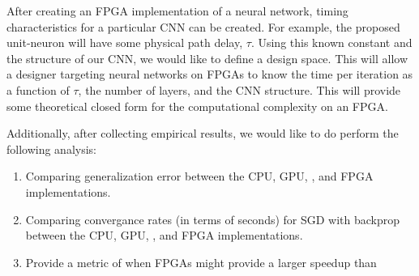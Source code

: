 After creating an FPGA implementation of a neural network, timing characteristics for a particular CNN can be created. For example, the proposed unit-neuron will have some physical path delay, $\tau$. Using this known constant and the structure of our CNN, we would like to define a design space. This will allow a designer targeting neural networks on FPGAs to know the time per iteration as a function of $\tau$, the number of layers, and the CNN structure. This will provide some theoretical closed form for the computational complexity on an FPGA.

Additionally, after collecting empirical results, we would like to do perform the following analysis:
\begin{enumerate}
	\item Comparing generalization error between the CPU, GPU, {}, and FPGA implementations.
	\item Comparing convergance rates (in terms of seconds) for SGD with backprop between the CPU, GPU, {}, and FPGA implementations.
	\item Provide a metric of when FPGAs might provide a larger speedup than {}
\end{enumerate}
